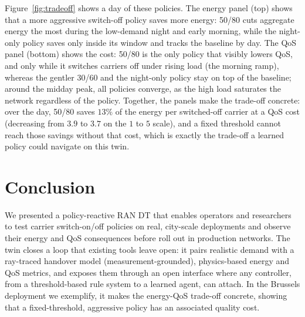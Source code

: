 \documentclass[sigconf, 10pt, anonymous, review]{acmart}
\begin{document}
Figure~\ref{fig:tradeoff} shows a day of these policies. 
The energy panel (top) shows that a more aggressive switch-off policy saves more energy: 50/80 cuts aggregate energy the most during the low-demand night and early morning, while the night-only policy saves only inside its window and tracks the baseline by day. 
The \ac{QoS} panel (bottom) shows the cost: 50/80 is the only policy that visibly lowers \ac{QoS}, and only while it switches carriers off under rising load (the morning ramp), whereas the gentler 30/60 and the night-only policy stay on top of the baseline; around the midday peak, all policies converge, as the high load saturates the network regardless of the policy. 
Together, the panels make the trade-off concrete: over the day, 50/80 saves $13\%$ of the energy per switched-off carrier at a \ac{QoS} cost (decreasing from $3.9$ to $3.7$ on the $1$ to $5$ scale), and a fixed threshold cannot reach those savings without that cost, which is exactly the trade-off a learned policy could navigate on this twin.




\section{Conclusion}
\label{sec:conclusion}
We presented a policy-reactive \ac{RAN} \ac{DT} that enables operators and researchers to test carrier switch-on/off policies on real, city-scale deployments and observe their energy and \ac{QoS} consequences before roll out in production networks. 
The twin closes a loop that existing tools leave open: it pairs realistic demand with a ray-traced handover model (measurement-grounded), physics-based energy and \ac{QoS} metrics, and exposes them through an open interface where any controller, from a threshold-based rule system to a learned agent, can attach. 
In the Brussels deployment we exemplify, it makes the energy-QoS trade-off concrete, showing that a fixed-threshold, aggressive policy has an associated quality cost.



\end{document}

